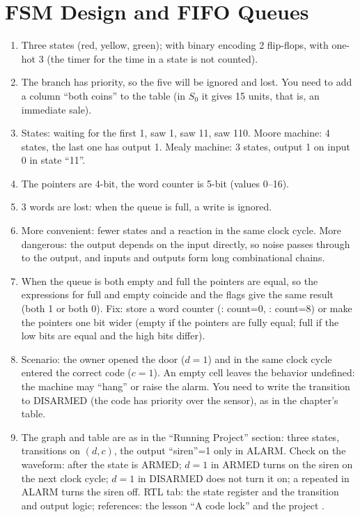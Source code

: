 \section*{FSM Design and FIFO Queues}
\begin{enumerate}
  \item {} Three states (red, yellow, green); with binary encoding 2 flip-flops, with one-hot 3 (the timer for the time in a state is not counted).
  \item {} The  branch has priority, so the five will be ignored and lost. You need to add a column ``both coins'' to the table (in $S_0$ it gives 15 units, that is, an immediate sale).
  \item {} States: waiting for the first 1, saw 1, saw 11, saw 110. Moore machine: 4 states, the last one has output 1. Mealy machine: 3 states, output 1 on input 0 in state ``11''.
  \item {} The pointers are 4-bit, the word counter is 5-bit (values 0--16).
  \item {} 3 words are lost: when the queue is full, a write is ignored.
  \item {} More convenient: fewer states and a reaction in the same clock cycle. More dangerous: the output depends on the input directly, so noise passes through to the output, and inputs and outputs form long combinational chains.
  \item {} When the queue is both empty and full the pointers are equal, so the expressions for full and empty coincide and the flags give the same result (both 1 or both 0). Fix: store a word counter (: count=0, : count=8) or make the pointers one bit wider (empty if the pointers are fully equal; full if the low bits are equal and the high bits differ).
  \item {} Scenario: the owner opened the door ($d=1$) and in the same clock cycle entered the correct code ($c=1$). An empty cell leaves the behavior undefined: the machine may ``hang'' or raise the alarm. You need to write the transition to DISARMED (the code has priority over the sensor), as in the chapter's table.
  \item {} The graph and table are as in the ``Running Project'' section: three states, transitions on $(d,c)$, the output ``siren''=1 only in ALARM. Check on the waveform: after  the state is ARMED; $d=1$ in ARMED turns on the siren on the next clock cycle; $d=1$ in DISARMED does not turn it on; a repeated  in ALARM turns the siren off. RTL tab: the state register and the transition and output logic; references: the lesson ``A code lock'' and the project .

\end{enumerate}
